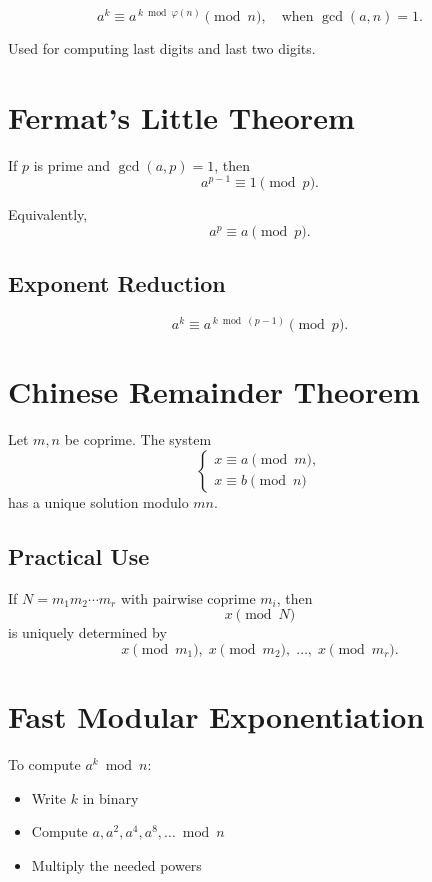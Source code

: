 \documentclass[11pt]{article}
\begin{document}
	\[
	a^k \equiv a^{\,k \bmod \varphi(n)} \pmod{n},
	\quad \text{when } \gcd(a,n)=1.
	\]
	
	Used for computing last digits and last two digits.
	
	
	\section*{Fermat's Little Theorem}
	
	If $p$ is prime and $\gcd(a,p)=1$, then
	\[
	a^{p-1} \equiv 1 \pmod{p}.
	\]
	
	Equivalently,
	\[
	a^p \equiv a \pmod{p}.
	\]
	
	\subsection*{Exponent Reduction}
	
	\[
	a^k \equiv a^{\,k \bmod (p-1)} \pmod{p}.
	\]
	
	
	\section*{Chinese Remainder Theorem}
	
	Let $m,n$ be coprime.  
	The system
	\[
	\begin{cases}
		x \equiv a \pmod{m}, \\
		x \equiv b \pmod{n}
	\end{cases}
	\]
	has a unique solution modulo $mn$.
	
	\subsection*{Practical Use}
	
	If $N = m_1 m_2 \cdots m_r$ with pairwise coprime $m_i$, then
	\[
	x \pmod{N}
	\]
	is uniquely determined by
	\[
	x \pmod{m_1}, \; x \pmod{m_2}, \; \dots, \; x \pmod{m_r}.
	\]
	
	
	\section*{Fast Modular Exponentiation}
	
	To compute $a^k \bmod n$:
	\begin{itemize}
		\item Write $k$ in binary
		\item Compute $a, a^2, a^4, a^8, \dots \bmod n$
		\item Multiply the needed powers
	\end{itemize}
	
\end{document}

